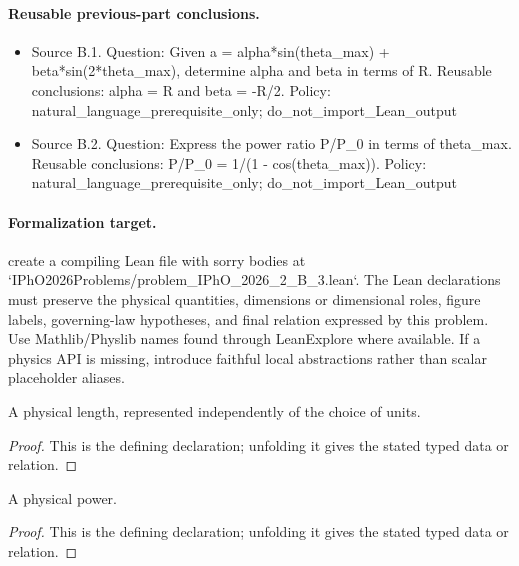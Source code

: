 \paragraph{Reusable previous-part conclusions.}
\begin{itemize}
\item Source B.1. Question: Given a = alpha*sin(theta\_max) + beta*sin(2*theta\_max), determine alpha and beta in terms of R. Reusable conclusions: alpha = R and beta = -R/2. Policy: natural\_language\_prerequisite\_only; do\_not\_import\_Lean\_output
\item Source B.2. Question: Express the power ratio P/P\_0 in terms of theta\_max. Reusable conclusions: P/P\_0 = 1/(1 - cos(theta\_max)). Policy: natural\_language\_prerequisite\_only; do\_not\_import\_Lean\_output
\end{itemize}

\paragraph{Formalization target.}
create a compiling Lean file with sorry bodies at `IPhO2026Problems/problem\_IPhO\_2026\_2\_B\_3.lean`. The Lean declarations must preserve the physical quantities, dimensions or dimensional roles, figure labels, governing-law hypotheses, and final relation expressed by this problem.
Use Mathlib/Physlib names found through LeanExplore where available. If a physics API is missing, introduce faithful local abstractions rather than scalar placeholder aliases.

\begin{definition}[PhysicalLength]
  \label{decl:physics:IPhO_2026_2_B_3:PhysicalLength}
  A physical length, represented independently of the choice of units.
\end{definition}
\begin{proof}
  This is the defining declaration; unfolding it gives the stated typed data or relation.
\end{proof}

\begin{definition}[OpticalPower]
  \label{decl:physics:IPhO_2026_2_B_3:OpticalPower}
  A physical power.
\end{definition}
\begin{proof}
  This is the defining declaration; unfolding it gives the stated typed data or relation.
\end{proof}

